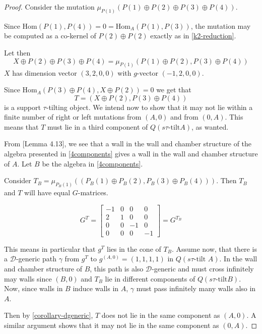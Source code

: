 \documentclass[]{article}
\theoremstyle{definition}
\newcommand{\tu}{\ensuremath{\tau}}
\begin{document}
\begin{proof}
	Consider the mutation $\mu_{P(1)}(P(1)\oplus P(2)\oplus P(3)\oplus P(4))$.
	
	Since $\text{Hom}(P(1),P(4)) = 0 = \text{Hom}_A(P(1),P(3))$, the mutation may be computed as a co-kernel of $P(2) \oplus P(2)$ exactly as in \cref{k2-reduction}.
	
	Let then \[X \oplus P(2) \oplus P(3) \oplus P(4) = \mu_{P(1)}(P(1)\oplus P(2),P(3)\oplus P(4))\]  $X$ has dimension vector $(3,2,0,0)$ with $g$-vector $(-1,2,0,0)$. 
	
	Since $\text{Hom}_A(P(3)\oplus P(4),X\oplus P(2)) = 0$ we get that \[T = (X \oplus P(2), P(3) \oplus P(4))\] is a support \tu-tilting object. We intend now to show that it may not lie within a finite number of right or left mutations from $(A,0)$ and from $(0,A)$. This means that $T$ must lie in a third component of $Q(s\tu\text{-tilt} A)$, as wanted.
	
	From \cite{Br_stle_2019}[Lemma 4.13], we see that a wall in the wall and chamber structure of the algebra presented in \cref{4components} gives a wall in the wall and chamber structure of $A$. Let $B$ be the algebra in \cref{4components}.
	
	Consider $T_B = \mu_{P_B(1)}((P_B(1) \oplus P_B(2), P_B(3) \oplus P_B(4)))$. Then $T_B$ and $T$ will have equal $G$-matrices.
	
	\[G^T = \begin{bmatrix}
		-1 & 0 & 0 & 0 \\ 2 & 1 & 0 & 0 \\ 0 & 0 & -1 & 0 \\ 0 & 0 & 0 & -1
	\end{bmatrix} = G^{T_B}\]
	
	This means in particular that $g^T$ lies in the cone of $T_B$. Assume now, that there is a $\mathcal{D}$-generic path $\gamma$ from $g^T$ to $g^{(A,0)} = (1,1,1,1)$ in $Q(s\tu\text{-tilt } A)$. In the wall and chamber structure of $B$, this path is also $\mathcal{D}$-generic and must cross infinitely may walls since $(B,0)$ and $T_B$ lie in different components of $Q(s\tau\text{-tilt} B)$. Now, since walls in $B$ induce walls in $A$, $\gamma$ must pass infinitely many walls also in $A$. 
	
	Then by \cref{corollary-dgeneric}, $T$ does not lie in the same component as $(A,0)$. A similar argument shows that it may not lie in the same component as $(0,A)$.
	
\end{proof}
\end{document}
